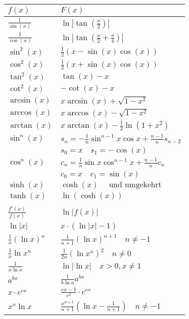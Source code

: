 	\hspace{-20pt}
	\begin{tabular}{l|l}
		$f(x)$ & $F(x)$ \\ \hline
		
		$ \frac{1}{\sin(x)} $  &  $ \ln \left|\tan(\frac{x}{2})\right| $ \\
		$ \frac{1}{\cos(x)} $  &  $ \ln \left|\tan(\frac{x}{2}+\frac{\pi}{4})\right| $ \\
		$ \sin^2(x) $  &  $ \frac{1}{2} (x-\sin(x)\cos(x)) $ \\
		$ \cos^2(x) $  &  $ \frac{1}{2} (x+\sin(x)\cos(x)) $ \\
		$ \tan^2(x) $  &  $ \tan(x)-x $ \\
		$ \cot^2(x) $  &  $ -\cot(x)-x $ \\
		$ \arcsin(x) $  &  $ x \arcsin(x) + \sqrt{1-x^2} $ \\
		$ \arccos(x) $  &  $ x \arccos(x) - \sqrt{1-x^2} $ \\
		$ \arctan(x) $  &  $ x \arctan(x) - \frac{1}{2} \ln (1+x^2) $ \\
		$ \sin^n(x) $  &  $ \scriptstyle s_n=-\frac{1}{n} \sin^{n-1}x \cos x+\frac{n-1}{n} s_{n-2} $ \\
		$  $  &  $ \scriptstyle s_0 = x\quad s_1 = - \cos(x) $ \\
		$ \cos^n(x) $  &  $ \scriptstyle c_n=\frac{1}{n} \sin x \cos^{n-1} x + \frac{n-1}{n} c_n $ \\
		$  $  &  $ \scriptstyle c_0 = x\quad c_1 = \sin(x) $ \\
		$ \sinh(x) $  &  $ \cosh(x)\quad \text{ und umgekehrt} $ \\
		$ \tanh(x) $  &  $ \ln(\cosh(x)) $ \\
		$  $  &  $  $ \\
		$ \frac{f'(x)}{f(x)} $   &   $ \ln {| f(x) |} $ \\
		$ \ln |x| $  &  $ x \cdot (\ln |x| - 1) $ \\
		$ \frac{1}{x}(\ln x)^n $  &  $ \frac{1}{n+1} (\ln x)^{n+1} \quad \scriptstyle  n \neq -1 $ \\
		$ \frac{1}{x}\ln x^n $  &  $ \frac{1}{2n} (\ln x^n)^{2} \quad \scriptstyle  n \neq 0 $ \\
		$ \frac{1}{x \ln x} $  &  $ \ln |\ln x| \quad \scriptstyle x>0,x\neq 1 $ \\
		$ a^{bx} $  &  $ \frac{1}{b \ln a} a^{bx} $ \\
		$ x\cdot e^{cx} $  &  $ \frac{cx-1}{c^2} \cdot e^{cx} $ \\
		$ x^n \ln x $  &  $ \frac{x^{n+1}}{n+1} \left( \ln x - \frac{1}{n+1} \right) \quad \scriptstyle  n \neq -1 $ \\

\end{tabular}
